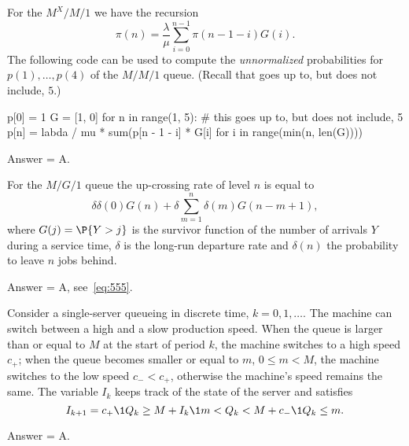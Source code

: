 \begin{exercise}[201907]
 For the $M^X/M/1$ we have the recursion
\begin{equation*}
\pi(n) = \frac \lambda \mu \sum_{i=0}^{n-1} \pi(n-1-i)G(i).
\end{equation*}
The following code can be used to compute the \emph{unnormalized} probabilities for $p(1),\ldots, p(4)$ of the $M/M/1$ queue.
(Recall that  goes up to, but does not include, $5$.)

\begin{pyverbatim}
p[0] = 1
G = [1, 0]
for n in range(1, 5): # this goes up to, but does not include, 5
 p[n] = labda / mu * sum(p[n - 1 - i] * G[i] for i in range(min(n, len(G))))

\end{pyverbatim}

\begin{solution}
Answer = A.
\end{solution}
\end{exercise}

\begin{exercise}[201907]
For the $M/G/1$ queue the up-crossing rate of level $n$ is equal to 
\begin{equation}
\delta \delta(0) G(n) + \delta \sum_{m=1}^n \delta(m) G(n-m+1),
\end{equation}
where $G(j) = \P{Y > j}$ is the survivor function of the number of arrivals $Y$ during a service time, $\delta$ is the long-run departure rate and $\delta(n)$ the probability to leave $n$ jobs behind. 
\begin{solution}
Answer = A, see~\cref{eq:555}.
\end{solution}
\end{exercise}

\begin{exercise}[201907]
 Consider a single-server queueing in discrete time, $k=0,1,\ldots$.
 The machine can switch between a high and a slow production speed.
 When the queue is larger than or equal to $M$ at the start of period $k$, the machine switches to a high speed $c_+$; when the queue becomes smaller or equal to $m$, $0\leq m<M$, the machine switches to the low speed $c_- < c_+$, otherwise the machine's speed remains the same.
 The variable $I_k$ keeps track of the state of the server and satisfies
\begin{equation*}
 I_{k+1} = c_+ \1{Q_k\geq M} + I_k \1{m<Q_k<M} + c_-\1{Q_k \leq m}.
\end{equation*}
\begin{solution}
Answer = A.
\end{solution}
\end{exercise}


